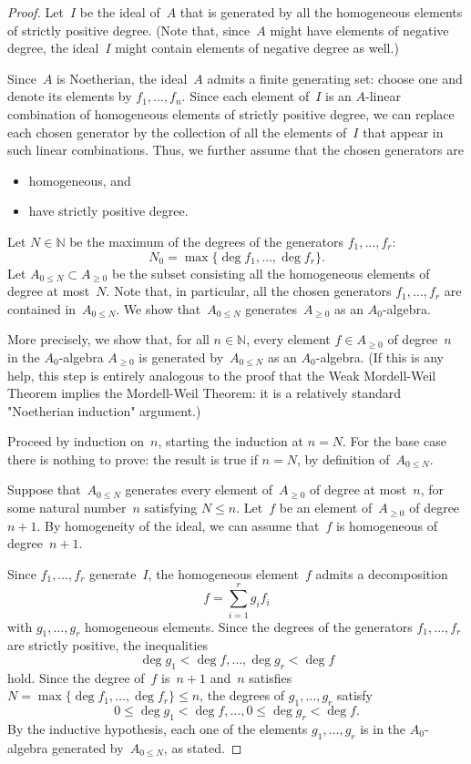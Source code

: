 \documentclass{amsart}
\newcommand{\N}{\mathbb{N}}
\newcommand{\Az}{A_{\geq0}}
\newcommand{\An}{A_{0\leq N}}
\begin{document}
\begin{proof}
Let~$I$ be the ideal of~$A$ that is generated by all the homogeneous elements of strictly positive degree.  (Note that, since~$A$ might have elements of negative degree, the ideal~$I$ might contain elements of negative degree as well.)

Since~$A$ is Noetherian, the ideal~$A$ admits a finite generating set: choose one and denote its elements by $f_1, \ldots , f_n$.  Since each element of~$I$ is an $A$-linear combination of homogeneous elements of strictly positive degree, we can replace each chosen generator by the collection of all the elements of~$I$ that appear in such linear combinations.  Thus, we further assume that the chosen generators are
\begin{itemize}
\item
homogeneous, and
\item
have strictly positive degree.
\end{itemize}
Let $N \in \N$ be the maximum of the degrees of the generators $f_1, \ldots , f_r$:
\[
N_0 = \max \{ \deg f_1 , \ldots , \deg f_r \}.
\]
Let $\An \subset \Az$ be the subset consisting all the homogeneous elements of degree at most~$N$.  Note that, in particular, all the chosen generators $f_1, \ldots , f_r$ are contained in~$\An$.  We show that~$\An$ generates~$\Az$ as an $A_0$-algebra.

More precisely, we show that, for all $n \in \N$, every element $f \in \Az$ of degree~$n$ in the $A_0$-algebra $\Az$ is generated by~$\An$ as an $A_0$-algebra. (If this is any help, this step is entirely analogous to the proof that the Weak Mordell-Weil Theorem implies the Mordell-Weil Theorem: it is a relatively standard "Noetherian induction" argument.)

Proceed by induction on~$n$, starting the induction at $n = N$.  For the base case there is nothing to prove: the result is true if $n = N$, by definition of~$\An$.

Suppose that~$\An$ generates every element of~$\Az$ of degree at most~$n$, for some natural number~$n$ satisfying $N \le n$.  Let~$f$ be an element of~$\Az$ of degree $n+1$.  By homogeneity of the ideal, we can assume that~$f$ is homogeneous of degree~$n+1$.

Since $f_1, \ldots, f_r$ generate~$I$, the homogeneous element~$f$ admits a decomposition
\[
f = \sum_{i = 1}^r g_i f_i
\]
with $g_1, \ldots, g_r$ homogeneous elements.  Since the degrees of the generators $f_1, \ldots , f_r$ are strictly positive, the inequalities
\[
\deg g_1 < \deg f, \ldots , \deg g_r < \deg f
\]
hold.  Since the degree of~$f$ is~$n+1$ and~$n$ satisfies $N = \max \{\deg f_1 , \ldots , \deg f_r \} \le n$, the degrees of $g_1, \ldots , g_r$ satisfy
\[
0 \le \deg g_1 < \deg f, \ldots , 0 \le \deg g_r < \deg f.
\]
By the inductive hypothesis, each one of the elements $g_1, \ldots , g_r$ is in the $A_0$-algebra generated by~$\An$, as stated.


\end{proof}
\end{document}
